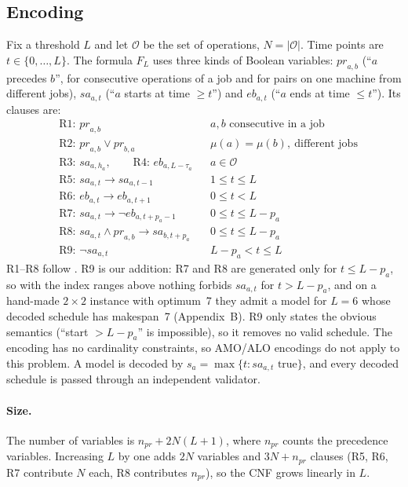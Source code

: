 \documentclass[a4paper,fleqn]{cas-sc}
\newcommand{\pr}{\mathit{pr}}
\newcommand{\sa}{\mathit{sa}}
\newcommand{\eb}{\mathit{eb}}
\begin{document}
\subsection{Encoding}
Fix a threshold $L$ and let $\mathcal O$ be the set of operations, $N=|\mathcal O|$.
Time points are $t\in\{0,\dots,L\}$.
The formula $F_L$ uses three kinds of Boolean variables:
$\pr_{a,b}$ (``$a$ precedes $b$'', for consecutive operations of a job and for pairs on one machine from different jobs),
$\sa_{a,t}$ (``$a$ starts at time $\ge t$'') and
$\eb_{a,t}$ (``$a$ ends at time $\le t$'').
Its clauses are:
\begin{align*}
&\text{R1: } \pr_{a,b} && a,b \text{ consecutive in a job}\\
&\text{R2: } \pr_{a,b}\vee\pr_{b,a} && \mu(a)=\mu(b),\ \text{different jobs}\\
&\text{R3: } \sa_{a,h_a}, \qquad \text{R4: } \eb_{a,L-\tau_a} && a\in\mathcal O\\
&\text{R5: } \sa_{a,t}\to\sa_{a,t-1} && 1\le t\le L\\
&\text{R6: } \eb_{a,t}\to\eb_{a,t+1} && 0\le t<L\\
&\text{R7: } \sa_{a,t}\to\neg\eb_{a,t+p_a-1} && 0\le t\le L-p_a\\
&\text{R8: } \sa_{a,t}\wedge\pr_{a,b}\to\sa_{b,t+p_a} && 0\le t\le L-p_a\\
&\text{R9: } \neg\sa_{a,t} && L-p_a< t\le L
\end{align*}
R1--R8 follow \citet{koshimura2010}. R9 is our addition: R7 and R8 are generated only for $t\le L-p_a$, so with the index ranges above nothing forbids $\sa_{a,t}$ for $t>L-p_a$, and on a hand-made $2\times2$ instance with optimum~7 they admit a model for $L=6$ whose decoded schedule has makespan~7 (Appendix~B).
R9 only states the obvious semantics (``start $>L-p_a$'' is impossible), so it removes no valid schedule.
The encoding has no cardinality constraints, so AMO/ALO encodings do not apply to this problem.
A model is decoded by $s_a=\max\{t:\sa_{a,t}\text{ true}\}$, and every decoded schedule is passed through an independent validator.

\paragraph{Size.}
The number of variables is $n_{\pr}+2N(L+1)$, where $n_{\pr}$ counts the precedence variables.
Increasing $L$ by one adds $2N$ variables and $3N+n_{\pr}$ clauses (R5, R6, R7 contribute $N$ each, R8 contributes $n_{\pr}$), so the CNF grows linearly in $L$.
\end{document}

